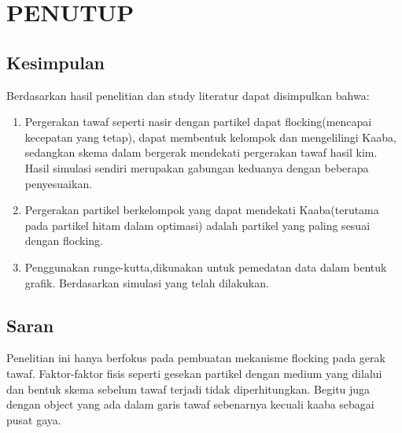 %
%
\chapter{PENUTUP}\label{cha:penutup}
\section{Kesimpulan}

\hspace{0.5cm} Berdasarkan hasil penelitian dan study literatur dapat disimpulkan bahwa:

\begin{enumerate} 
\item  Pergerakan tawaf seperti nasir dengan partikel dapat flocking(mencapai kecepatan yang tetap), dapat membentuk kelompok dan mengelilingi Kaaba, sedangkan skema dalam bergerak mendekati pergerakan tawaf hasil kim. Hasil simulasi sendiri merupakan gabungan keduanya dengan beberapa penyesuaikan.
\item  Pergerakan partikel berkelompok yang dapat mendekati Kaaba(terutama pada partikel hitam dalam optimasi) adalah partikel yang paling sesuai dengan flocking. 
\item  Penggunakan runge-kutta,dikunakan untuk pemedatan data dalam bentuk grafik. Berdasarkan simulasi yang telah dilakukan.
\end{enumerate} 


\newpage
\section{Saran}\label{cha:saran}

\hspace{0.5cm} Penelitian ini hanya berfokus pada pembuatan mekanisme flocking pada gerak tawaf. Faktor-faktor fisis seperti gesekan partikel dengan medium yang dilalui dan bentuk skema sebelum tawaf terjadi tidak diperhitungkan. Begitu juga dengan object yang ada dalam garis tawaf sebenarnya kecuali kaaba sebagai pusat gaya. 

%